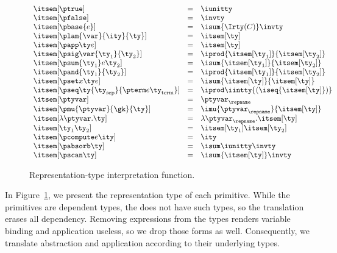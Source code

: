 \begin{figure}
\fbox{$\itsem[\ty] = \ity$}
\[
\begin{array}{lcl} 
\itsem[\ptrue] & = & \iunitty \\
\itsem[\pfalse] & = & \invty \\
\itsem[\pbase{e}] & = & \isum {\Irty(C)} \invty   \\
\itsem[\plam{\var}{\ity}{\ty}] & = & \itsem[\ty] \\
\itsem[\papp \ty e] & = & \itsem[\ty] \\
\itsem[\psig \var {\ty_1} {\ty_2}]  & = & \iprod {\itsem[\ty_1]} {\itsem[\ty_2]}    \\
\itsem[\psum {\ty_1} e {\ty_2}]     & = & \isum {\itsem[\ty_1]} {\itsem[\ty_2]} \\
\itsem[\pand {\ty_1} {\ty_2}]  & = & \iprod {\itsem[\ty_1]}{\itsem[\ty_2]}\\
\itsem[\pset x \ty e] & = & \isum {\itsem[\ty]}{\itsem[\ty]}\\
\itsem[\pseq \ty {\ty_{\text{sep}}} {\pterm e {\ty_{\text{term}}}}] & = & 
    \iprod \iintty {(\iseq{\itsem[\ty]})}             \\
\itsem[\ptyvar] & = & \ptyvar_\repname \\
\itsem[\pmu{\ptyvar}{\gk}{\ty}] & = & \imu{\ptyvar_\repname}{\itsem[\ty]} \\
\itsem[\lambda \ptyvar.\ty]       & = & \lambda \ptyvar_\repname.\itsem[\ty] \\
\itsem[\ty_1 \ty_2]              & = & \itsem[\ty_1] \itsem[\ty_2] \\
\itsem[\pcompute e \ity]                 & = & \ity \\
\itsem[\pabsorb \ty]                     & = & \isum \iunitty \invty \\
\itsem[\pscan \ty] & = & \isum {\itsem[\ty]} \invty
\end{array}
\]
\caption{Representation-type interpretation function.}
\label{fig:rep-tys}
\end{figure}

In Figure~\ref{fig:rep-tys}, we present the representation type of
each \ddc{} primitive. While the primitives are dependent types, the
\implang{} does not have such types, so the translation erases all
dependency. Removing expressions from the types renders variable
binding and application useless, so we drop those forms as well.
Consequently, we translate abstraction and application according to their
underlying types. 

